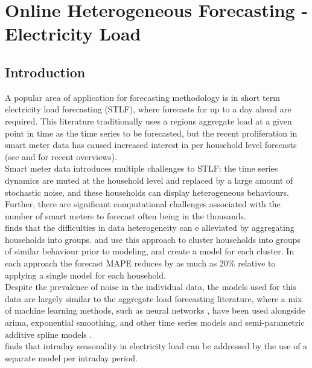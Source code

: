 \documentclass[
12pt, %
onehalfspacing, %
nohyperref, %
headsepline, %
chapterinoneline, %
]{MastersDoctoralThesis} %
\begin{document}
\chapter{Online Heterogeneous Forecasting - Electricity Load}
\label{chap:elec}

\section{Introduction}
\label{sec:elecIntro}
A popular area of application for forecasting methodology is in short term electricity load forecasting (STLF), where forecasts for up to a day ahead are required. This literature traditionally uses a regions aggregate load at a given point in time as the time series to be forecasted, but the recent proliferation in smart meter data has caused increased interest in per household level forecasts (see \cite{Mirowski2014} and \cite{Yildiz2017} for recent overviews).
\\
 
Smart meter data introduces multiple challenges to STLF: the time series dynamics are muted at the household level and replaced by a large amount of stochastic noise, and these households can display heterogeneous behaviours. Further, there are significant computational challenges associated with the number of smart meters to forecast often being in the thousands.
\\

\citet{DaSilva2013} finds that the difficulties in data heterogeneity can e alleviated by aggregating households into groups. \citet{Shahzedah2015} and \citet{Quilumba2015} use this approach to cluster households into groups of similar behaviour prior to modeling, and create a model for each cluster. In each approach the forecast MAPE reduces by as much as 20\% relative to applying a single model for each household.
\\

Despite the prevalence of noise in the individual data, the models used for this data are largely similar to the aggregate load forecasting literature, where a mix of machine learning methods, such as neural networks \citep{Singhai2011, Niska2015, Bianchi2017}, have been used alongside arima, exponential smoothing, and other time series models \citep{Taylor2003, Taylor2008, Ghofrani2011} and semi-parametric additive spline models \citep{Hyndman2010, Fan2012, Taieb2016}.
\\

\citet{Ramanathan1997} finds that intraday seasonality in electricity load can be addressed by the use of a separate model per intraday period.
\\
\end{document}
